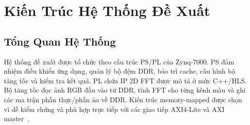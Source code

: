 ﻿\documentclass[conference]{IEEEtran}
\begin{document}
\section{Kiến Trúc Hệ Thống Đề Xuất}
\label{sec:methodology}
\subsection{Tổng Quan Hệ Thống}
Hệ thống đề xuất được tổ chức theo cấu trúc PS/PL của Zynq-7000. PS đảm nhiệm điều khiển ứng dụng, quản lý bộ đệm DDR, bảo trì cache, cấu hình bộ tăng tốc và kiểm tra kết quả. PL chứa IP 2D FFT được mô tả ở mức C++/HLS. Bộ tăng tốc đọc ảnh RGB đầu vào từ DDR, tính FFT cho từng kênh màu và ghi các ma trận phần thực/phần ảo về DDR. Kiến trúc memory-mapped được chọn vì dễ kiểm chứng và phù hợp trực tiếp với các giao tiếp AXI4-Lite và AXI master~\cite{amd_vitis_hls,xilinx_axi_ref}.
\end{document}
